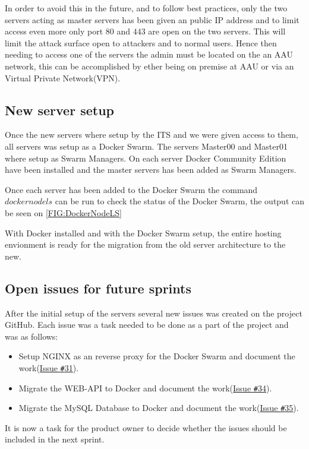 In order to avoid this in the future, and to follow best practices, only the two servers acting as master servers has been given an public IP address and to limit access even more only port $80$ and $443$ are open on the two servers. 
This will limit the attack surface open to attackers and to normal users. 
Hence then needing to access one of the servers the admin must be located on the an AAU network, this can be accomplished by ether being on premise at AAU or via an Virtual Private Network(VPN).

\subsection{New server setup}

Once the new servers where setup by the ITS and we were given access to them, all servers was setup as a Docker Swarm. 
The servers Master00 and Master01 where setup as Swarm Managers. 
On each server Docker Community Edition have been installed and the master servers has been added as Swarm Managers. 

Once each server has been added to the Docker Swarm the command $docker node ls$ can be run to check the status of the Docker Swarm, the output can be seen on \autoref{FIG:DockerNodeLS}

With Docker installed and with the Docker Swarm setup, the entire hosting envionment is ready for the migration from the old server architecture to the new.

\subsection{Open issues for future sprints}
After the initial setup of the servers several new issues was created on the project GitHub. 
Each issue was a task needed to be done as a part of the project and was as follows:

\begin{itemize}
\item Setup NGINX as an reverse proxy for the Docker Swarm and document the work(\href{https://github.com/aau-giraf/wiki/issues/31}{Issue \texttt{\#}31}).
\item Migrate the WEB-API to Docker and document the work(\href{https://github.com/aau-giraf/wiki/issues/34}{Issue \texttt{\#}34}).
\item Migrate the MySQL Database to Docker and document the work(\href{https://github.com/aau-giraf/wiki/issues/35}{Issue \texttt{\#}35}).
\end{itemize}

It is now a task for the product owner to decide whether the issues should be included in the next sprint.